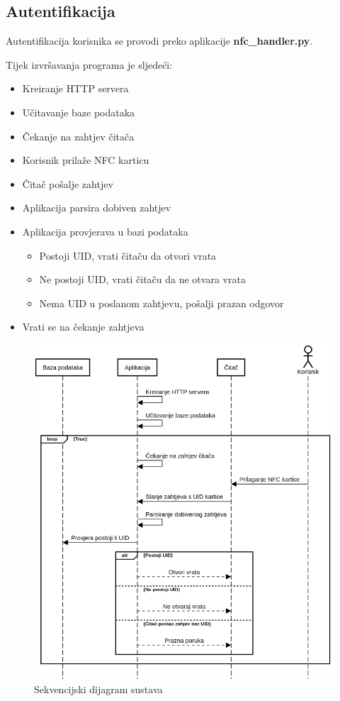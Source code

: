 \documentclass[times, utf8, zavrsni]{fer}
\begin{document}
\subsection{Autentifikacija}
Autentifikacija korisnika se provodi preko aplikacije \textbf{nfc\_handler.py}.\par
Tijek izvršavanja programa je sljedeći:
\begin{itemize}
\item Kreiranje HTTP servera
\item Učitavanje baze podataka
\item Čekanje na zahtjev čitača
\item Korisnik prilaže NFC karticu
\item Čitač pošalje zahtjev
\item Aplikacija parsira dobiven zahtjev
\item Aplikacija provjerava u bazi podataka 
   \begin{itemize}
   \item Postoji UID, vrati čitaču da otvori vrata
   \item Ne postoji UID, vrati čitaču da ne otvara vrata
   \item Nema UID u poslanom zahtjevu, pošalji prazan odgovor
   \end{itemize}
\item Vrati se na čekanje zahtjeva
\end{itemize}

\begin{figure}[h]
\includegraphics[scale=0.5]{sequence.png}
\centering
\caption{Sekvencijski dijagram sustava}
\centering
\end{figure}
\end{document}
